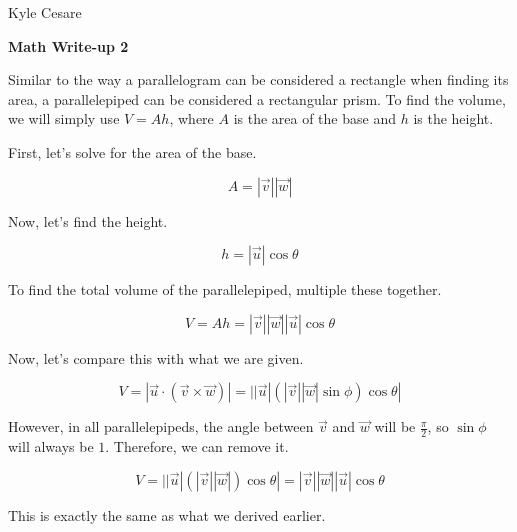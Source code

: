 \documentclass[11pt]{article}
\begin{document}
\begin{flushright}
  Kyle Cesare
\end{flushright}

{\center \textbf{Math Write-up 2} \\}

Similar to the way a parallelogram can be considered a rectangle when finding
its area, a parallelepiped can be considered a rectangular prism.  To find the
volume, we will simply use $V = Ah$, where $A$ is the area of the base and $h$
is the height.

\vspace{10mm}

First, let's solve for the area of the base.

$$
  A = |\vec v||\vec w|
$$

Now, let's find the height.

$$
  h = |\vec u|\cos\theta
$$

To find the total volume of the parallelepiped, multiple these together.

$$
  V = Ah = |\vec v||\vec w||\vec u|\cos\theta
$$

Now, let's compare this with what we are given.

$$
  V = |\vec u \cdot (\vec v \times \vec w)| = | |\vec u|(|\vec v||\vec w|\sin\phi)\cos\theta |
$$

However, in all parallelepipeds, the angle between $\vec v$ and $\vec w$ will be
$\frac{\pi}{2}$, so $\sin\phi$ will always be $1$.  Therefore, we can remove it.

$$
  V = | |\vec u|(|\vec v||\vec w|)\cos\theta | = |\vec v||\vec w||\vec u|\cos\theta
$$

This is exactly the same as what we derived earlier.
\end{document}
